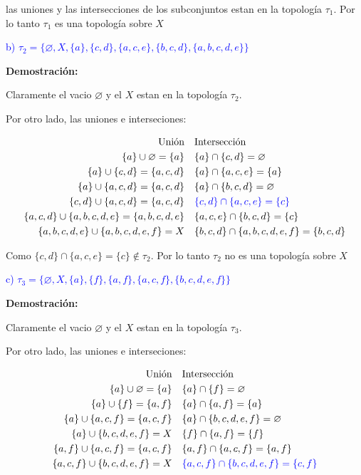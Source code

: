 \documentclass[
]{article}
\begin{document}
las uniones y las intersecciones de los subconjuntos estan en la
topología \(\tau_{1}\). Por lo tanto \(\tau_{1}\) es una topología sobre
\(X\)

\textcolor{blue}{b) $\tau_{2} =\{ \varnothing,X,\{a\},\{c,d\},\{a,c,e\},\{b,c,d\},\{a,b,c,d,e\}\}$}

\textbf{Demostración:}

Claramente el vacio \(\varnothing\) y el \(X\) estan en la topología
\(\tau_2\).

Por otro lado, las uniones e interseciones:

\begin{align*}
\mbox{Unión}                               &        &          &\mbox{Intersección} \\
\{a\} \cup \varnothing =\{a\}              &        &          &\{a\} \cap \{c,d\}=\varnothing \\
\{a\} \cup \{c,d\}=\{a,c,d\}               &        &          &\{a\} \cap \{a,c,e\}=\{a\} \\
\{a\} \cup \{a,c,d\}=\{a,c,d\}             &        &          &\{a\} \cap \{b,c,d\}=\varnothing \\
\{c,d\} \cup \{a,c,d\}=\{a,c,d\}           &        &          &\textcolor{blue}{\{c,d\} \cap \{a,c,e\}=\{c\}} \\
\{a,c,d\} \cup \{a,b,c,d,e\}=\{a,b,c,d,e\} &        &          &\{a,c,e\} \cap \{b,c,d\}=\{c\} \\
\{a,b,c,d,e\} \cup \{a,b,c,d,e,f\}= X      &        &          &\{b,c,d\} \cap \{a,b,c,d,e,f\}=\{b,c,d\} 
\end{align*}

Como \(\{c,d\} \cap \{a,c,e\}=\{c\} \notin \tau_2\). Por lo tanto
\(\tau_{2}\) no es una topología sobre \(X\)

\textcolor{blue}{c) $\tau_{3} =\{ \varnothing,X,\{a\},\{f\},\{a,f\},\{a,c,f\},\{b,c,d,e,f\}\}$}

\textbf{Demostración:}

Claramente el vacio \(\varnothing\) y el \(X\) estan en la topología
\(\tau_3\).

Por otro lado, las uniones e interseciones:

\begin{align*}
\mbox{Unión}                               &        &          &\mbox{Intersección} \\
\{a\} \cup \varnothing =\{a\}              &        &          &\{a\} \cap \{f\}=\varnothing \\
\{a\} \cup \{f\}=\{a,f\}                   &        &          &\{a\} \cap \{a,f\}=\{a\} \\
\{a\} \cup \{a,c,f\}=\{a,c,f\}             &        &          &\{a\} \cap \{b,c,d,e,f\}=\varnothing \\
\{a\} \cup \{b,c,d,e,f\}= X                &        &          &\{f\} \cap \{a,f\}=\{f\} \\
\{a,f\} \cup \{a,c,f\}=\{a,c,f\}           &        &          &\{a,f\} \cap \{a,c,f\}=\{a,f\} \\
\{a,c,f\} \cup \{b,c,d,e,f\}= X            &        &          &\textcolor{blue}{\{a,c,f\} \cap \{b,c,d,e,f\}=\{c,f\}}
\end{align*}
\end{document}
